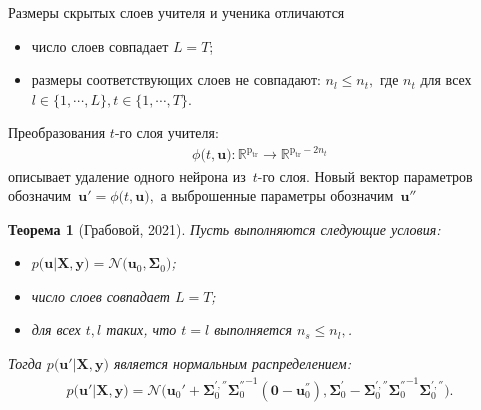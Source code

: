 \documentclass[10pt,pdf,hyperref={unicode}]{beamer}
\newtheorem{rustheorem}{Теорема}
\begin{document}
\begin{frame}{Размеры скрытых слоев учителя и ученика отличаются}
\begin{itemize}
    \item число слоев совпадает $L=T$;
    \item размеры соответствующих слоев не совпадают: $n_l \leq n_t,$ где $n_t$ для всех $l \in \{1,\cdots,L\}, t \in \{1,\cdots,T\}$.
\end{itemize}
Преобразования $t$-го слоя учителя:
\[
\begin{aligned}
\phi\bigr(t, \mathbf{u}\bigr) : \mathbb{R}^{\text{p}_{\text{tr}}} \to \mathbb{R}^{\text{p}_{\text{tr}}-2n_t}
\end{aligned}
\]
описывает удаление одного нейрона из~$t$-го слоя. Новый вектор параметров обозначим~$\mathbf{u}' =  \phi\bigr(t, \mathbf{u}\bigr),$ а выброшенные параметры обозначим~$\mathbf{u}''$

\begin{rustheorem}[Грабовой, 2021]
Пусть выполняются следующие условия:
\begin{itemize}
\item $p\bigr(\mathbf{u}|\mathbf{X}, \mathbf{y}\bigr) = \mathcal{N}\bigr(\mathbf{u}_0, \bm{\Sigma}_0\bigr)$;
\item число слоев совпадает $L=T$;
\item для всех $t, l$ таких, что $t=l$ выполняется $n_s \leq n_l,$.
\end{itemize}
Тогда $p\bigr(\mathbf{u}'|\mathbf{X}, \mathbf{y}\bigr)$ является нормальным распределением:
\[
\begin{aligned}
p\bigr(\mathbf{u}'|\mathbf{X}, \mathbf{y}\bigr) = \mathcal{N}\bigr(\mathbf{u}_{0}'+\bm{\Sigma}_0^{', ''}{\bm{\Sigma}_0^{''}}^{-1}\left(\mathbf{0} - \mathbf{u}_0^{''}\right), \bm{\Sigma}_0^{'}-\bm{\Sigma}_0^{', ''}{\bm{\Sigma}_0^{''}}^{-1}\bm{\Sigma}_0^{', ''}\bigr).
\end{aligned}
\]
\end{rustheorem}

\end{frame}
\end{document}
